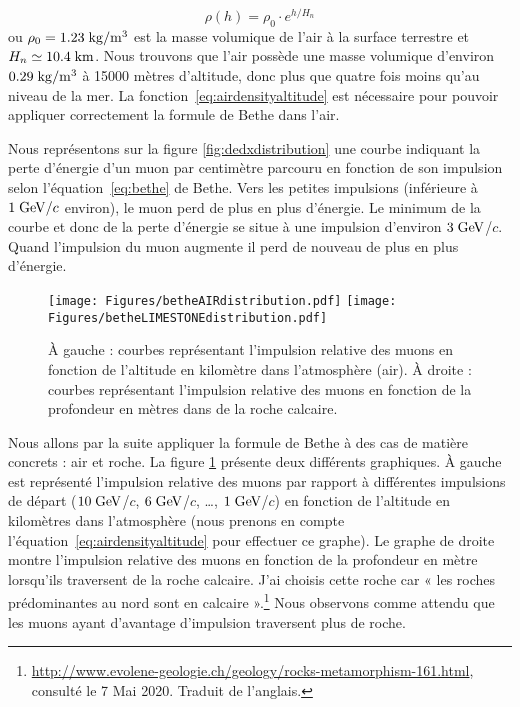\documentclass[a4paper, 12pt]{article}
\begin{document}
\begin{spacing}{1.5}
\begin{equation}
\rho(h) = \rho_0\cdot e^{h/H_n} \label{eq:airdensityaltitude}
\end{equation}
ou $\rho_0=1.23\;{\rm kg/m^3}$ est la masse volumique de l'air à la surface terrestre et $H_n\simeq10.4\;{\rm km}$. Nous trouvons que l'air possède une masse volumique d'environ $0.29\;{\rm kg/m^3}$ à 15000 mètres d'altitude, donc plus que quatre fois moins qu'au niveau de la mer. La fonction~\ref{eq:airdensityaltitude} est nécessaire pour pouvoir appliquer correctement la formule de Bethe dans l'air.

Nous représentons sur la figure \ref{fig:dedxdistribution} une courbe indiquant la perte d'énergie d'un muon par centimètre parcouru en fonction de son impulsion selon l'équation~\ref{eq:bethe} de Bethe. Vers les petites impulsions (inférieure à $1 {\rm\;GeV}/c$ environ), le muon perd de plus en plus d'énergie. Le minimum de la courbe et donc de la perte d'énergie se situe à une impulsion d'environ $3\;{\rm GeV}$/$c$. Quand l'impulsion du muon augmente il perd de nouveau de plus en plus d'énergie.

\begin{figure}[t]
\begin{center}
  \texttt{[image: Figures/betheAIRdistribution.pdf]}
  \texttt{[image: Figures/betheLIMESTONEdistribution.pdf]}
\caption{\label{fig:BetheDistribution} À gauche : courbes représentant l'impulsion relative des muons en fonction de l'altitude en kilomètre dans l'atmosphère (air). À droite : courbes représentant l'impulsion relative des muons en fonction de la profondeur en mètres dans de la roche calcaire.}
\end{center} 
\end{figure}

Nous allons par la suite appliquer la formule de Bethe à des cas de matière concrets : air et roche. La figure \ref{fig:BetheDistribution} présente deux différents graphiques. À gauche est représenté l'impulsion relative des muons par rapport à différentes impulsions de départ ($ 10\;{\rm GeV}$/$c$, $ 6\;{\rm GeV}$/$c$, \dots, $ 1\;{\rm GeV}$/$c$) en fonction de l'altitude en kilomètres dans l'atmosphère (nous prenons en compte l'équation~\ref{eq:airdensityaltitude} pour effectuer ce graphe). Le graphe de droite montre l'impulsion relative des muons en fonction de la profondeur en mètre lorsqu'ils traversent de la roche calcaire. J'ai choisis cette roche car « les roches prédominantes au nord sont en calcaire ».\footnote{\url{http://www.evolene-geologie.ch/geology/rocks-metamorphism-161.html}, consulté le 7 Mai 2020. Traduit de l'anglais.} Nous observons comme attendu  que les muons ayant d'avantage d'impulsion traversent plus de roche.


\end{spacing}
\end{document}
